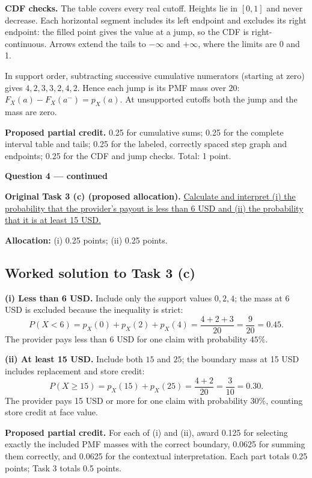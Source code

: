 \textbf{CDF checks.} The table covers every real cutoff. Heights lie in $[0,1]$ and never decrease. Each horizontal segment includes its left endpoint and excludes its right endpoint: the filled point gives the value at a jump, so the CDF is right-continuous. Arrows extend the tails to $-\infty$ and $+\infty$, where the limits are 0 and 1.

In support order, subtracting successive cumulative numerators (starting at zero) gives $4,2,3,3,2,4,2$. Hence each jump is its PMF mass over $20$: $F_X(a)-F_X(a^-)=p_X(a)$. At unsupported cutoffs both the jump and the mass are zero.

\textbf{Proposed partial credit.} 0.25 for cumulative sums; 0.25 for the complete interval table and tails; 0.25 for the labeled, correctly spaced step graph and endpoints; 0.25 for the CDF and jump checks. Total: 1 point.

\par\vspace{3mm}\secInicio[][sec:q4]

\clearpage
\textbf{Question 4 --- continued}

\textbf{Original Task 3 (c) (proposed allocation).} \hyperref[sol:q4t3]{Calculate and interpret (i) the probability that the provider's payout is less than 6 USD and (ii) the probability that it is at least 15 USD.} 

\textbf{Allocation:} (i) 0.25 points; (ii) 0.25 points.

\subsection*{Worked solution to Task 3 (c) }
\label{sol:q4t3}

\textbf{(i) Less than 6 USD.} Include only the support values $0,2,4$; the mass at 6 USD is excluded because the inequality is strict:
\[
P(X<6)=p_X(0)+p_X(2)+p_X(4)
=\frac{4+2+3}{20}=\frac9{20}=0.45.
\]
The provider pays less than 6 USD for one claim with probability $45\%$.

\textbf{(ii) At least 15 USD.} Include both $15$ and $25$; the boundary mass at 15 USD includes replacement and store credit:
\[
P(X\geq15)=p_X(15)+p_X(25)=\frac{4+2}{20}=\frac3{10}=0.30.
\]
The provider pays 15 USD or more for one claim with probability $30\%$, counting store credit at face value.

\textbf{Proposed partial credit.} For each of (i) and (ii), award 0.125 for selecting exactly the included PMF masses with the correct boundary, 0.0625 for summing them correctly, and 0.0625 for the contextual interpretation. Each part totals 0.25 points; Task 3 totals 0.5 points.

